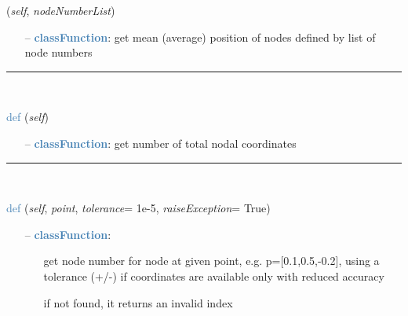 \begin{itemize}[leftmargin=1.4cm]
\begin{itemize}[leftmargin=0.5cm]
\begin{itemize}[leftmargin=1.4cm]
\begin{itemize}[leftmargin=1.4cm]
\begin{itemize}[leftmargin=0.5cm]
\begin{flushleft}
({\it self}, {\it nodeNumberList})
\end{flushleft}
\setlength{\itemindent}{0.7cm}
\begin{itemize}[leftmargin=0.7cm]
  \item[--]  \textcolor{steelblue}{\bf classFunction}: get mean (average) position of nodes defined by list of node numbers\vspace{12pt}\end{itemize}
%
\noindent\rule{8cm}{0.75pt}\vspace{1pt} \\ 
\begin{flushleft}
\noindent \textcolor{steelblue}{def {\bf {}}}\label{sec:FEM:FEMinterface:NumberOfCoordinates}
({\it self})
\end{flushleft}
\setlength{\itemindent}{0.7cm}
\begin{itemize}[leftmargin=0.7cm]
  \item[--]  \textcolor{steelblue}{\bf classFunction}: get number of total nodal coordinates\vspace{12pt}\end{itemize}
%
\noindent\rule{8cm}{0.75pt}\vspace{1pt} \\ 
\begin{flushleft}
\noindent \textcolor{steelblue}{def {\bf {}}}\label{sec:FEM:FEMinterface:GetNodeAtPoint}
({\it self}, {\it point}, {\it tolerance}= 1e-5, {\it raiseException}= True)
\end{flushleft}
\setlength{\itemindent}{0.7cm}
\begin{itemize}[leftmargin=0.7cm]
  \item[--]  \textcolor{steelblue}{\bf classFunction}: \vspace{-6pt}
  \begin{itemize}[leftmargin=1.2cm]
\setlength{\itemindent}{-0.7cm}
    \item[] get node number for node at given point, e.g. p=[0.1,0.5,-0.2], using a tolerance (+/-) if coordinates are available only with reduced accuracy
    \item[] if not found, it returns an invalid index
  \end{itemize}
\vspace{12pt}\end{itemize}

\end{itemize}
\end{itemize}
\end{itemize}
\end{itemize}
\end{itemize}
